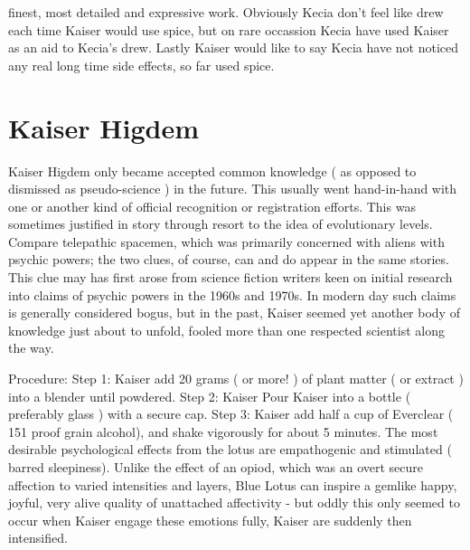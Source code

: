\documentclass[12pt]{book}
\begin{document}
finest, most detailed and expressive work. Obviously Kecia don't feel like drew each time Kaiser would use spice, but on rare occassion Kecia have used Kaiser as an aid to Kecia's drew. Lastly Kaiser would like to say Kecia have not noticed any real long time side effects, so far used spice.



\chapter{Kaiser Higdem}

Kaiser Higdem only became accepted common knowledge ( as opposed to dismissed as pseudo-science ) in the future. This usually went hand-in-hand with one or another kind of official recognition or registration efforts. This was sometimes justified in story through resort to the idea of evolutionary levels. Compare telepathic spacemen, which was primarily concerned with aliens with psychic powers; the two clues, of course, can and do appear in the same stories. This clue may has first arose from science fiction writers keen on initial research into claims of psychic powers in the 1960s and 1970s. In modern day such claims is generally considered bogus, but in the past, Kaiser seemed yet another body of knowledge just about to unfold, fooled more than one respected scientist along the way.



Procedure: Step 1: Kaiser add 20 grams ( or more! ) of plant matter ( or extract ) into a blender until powdered. Step 2: Kaiser Pour Kaiser into a bottle ( preferably glass ) with a secure cap. Step 3: Kaiser add half a cup of Everclear ( 151 proof grain alcohol), and shake vigorously for about 5 minutes. The most desirable psychological effects from the lotus are empathogenic and stimulated ( barred sleepiness). Unlike the effect of an opiod, which was an overt secure affection to varied intensities and layers, Blue Lotus can inspire a gemlike happy, joyful, very alive quality of unattached affectivity - but oddly this only seemed to occur when Kaiser engage these emotions fully, Kaiser are suddenly then intensified.
\end{document}
